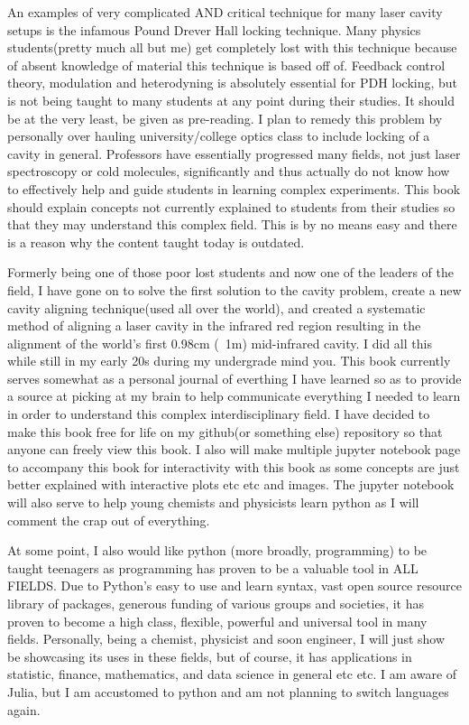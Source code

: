 \documentclass[11pt,a4paper]{book}
\begin{document}
	An examples of very complicated AND critical technique for many laser cavity setups is the infamous Pound Drever Hall locking technique. Many physics students(pretty much all but me) get completely lost with this technique because of absent knowledge of material this technique is based off of. Feedback control theory, modulation and heterodyning is absolutely essential for PDH locking, but is not being taught to many students at any point during their studies. It should be at the very least, be given as pre-reading. I plan to remedy this problem by personally over hauling university/college optics class to include locking of a cavity in general. Professors have essentially progressed many fields, not just laser spectroscopy or cold molecules, significantly and thus actually do not know how to effectively help and guide students in learning complex experiments. This book should explain concepts not currently explained to students from their studies so that they may understand this complex field. This is by no means easy and there is a reason why the content taught today is outdated.
	
	Formerly being one of those poor lost students and now one of the leaders of the field, I have gone on to solve the first solution to the cavity problem, create a new cavity aligning technique(used all over the world), and created a systematic method of aligning a laser cavity in the infrared red region resulting in the alignment of the world's first 0.98cm (~1m) mid-infrared cavity. I did all this while still in my early 20s during my undergrade mind you. This book currently serves somewhat as a personal journal of everthing I have learned so as to provide a source at picking at my brain to help communicate everything I needed to learn in order to understand this complex interdisciplinary field. I have decided to make this book free for life on my github(or something else) repository so that anyone can freely view this book. I also will make multiple jupyter notebook page to accompany this book for interactivity with this book as some concepts are just better explained with interactive plots etc etc and images. The jupyter notebook will also serve to help young chemists and physicists learn python as I will comment the crap out of everything.
	
	At some point, I also would like python (more broadly, programming) to be taught teenagers as programming has proven to be a valuable tool in ALL FIELDS. Due to Python's easy to use and learn syntax, vast open source resource library of packages,  generous funding of various groups and societies, it has proven to become a high class, flexible, powerful and universal tool in many fields. Personally, being a chemist, physicist and soon engineer, I will just show be showcasing its uses in these fields, but of course, it has applications in statistic, finance, mathematics, and data science in general etc etc. I am aware of Julia, but I am accustomed to python and am not planning to switch languages again.
	
\end{document}
